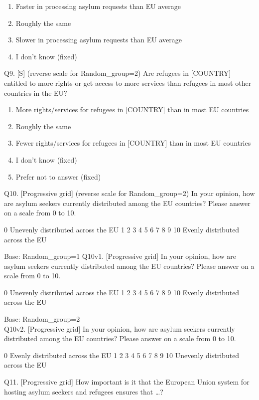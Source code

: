 \documentclass[
  12pt,
  a4paper,
]{article}
\providecommand{\tightlist}{%
  \setlength{\itemsep}{0pt}\setlength{\parskip}{0pt}}
\begin{document}
\begin{enumerate}
\def\labelenumi{\arabic{enumi}.}
\tightlist
\item
  Faster in processing asylum requests than EU average
\item
  Roughly the same
\item
  Slower in processing asylum requests than EU average
\item
  I don't know (fixed)
\end{enumerate}

Q9. {[}S{]} (reverse scale for Random\_group=2) Are refugees in {[}COUNTRY{]} entitled to more rights or get access to more services than refugees in most other countries in the EU?

\begin{enumerate}
\def\labelenumi{\arabic{enumi}.}
\tightlist
\item
  More rights/services for refugees in {[}COUNTRY{]} than in most EU countries
\item
  Roughly the same
\item
  Fewer rights/services for refugees in {[}COUNTRY{]} than in most EU countries
\item
  I don't know (fixed)
\item
  Prefer not to answer (fixed)
\end{enumerate}

Q10. {[}Progressive grid{]} (reverse scale for Random\_group=2) In your opinion, how are asylum seekers currently distributed among the EU countries? Please answer on a scale from 0 to 10.

0
Unevenly distributed across the EU 1 2 3 4 5 6 7 8 9 10
Evenly distributed across the EU

Base: Random\_group=1
Q10v1. {[}Progressive grid{]} In your opinion, how are asylum seekers currently distributed among the EU countries? Please answer on a scale from 0 to 10.

0
Unevenly distributed across the EU 1 2 3 4 5 6 7 8 9 10
Evenly distributed across the EU

Base: Random\_group=2\\
Q10v2. {[}Progressive grid{]} In your opinion, how are asylum seekers currently distributed among the EU countries? Please answer on a scale from 0 to 10.

0
Evenly distributed across the EU 1 2 3 4 5 6 7 8 9 10
Unevenly distributed across the EU

Q11. {[}Progressive grid{]} How important is it that the European Union system for hosting asylum seekers and refugees ensures that \ldots?
\end{document}
